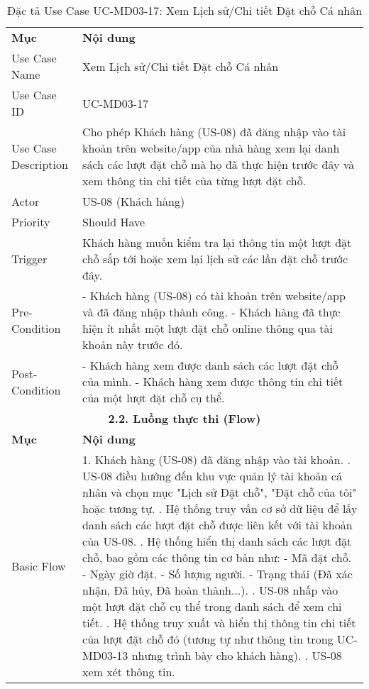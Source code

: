 \begin{longtable}{|m{4cm}|p{11cm}|}
\caption{Đặc tả Use Case UC-MD03-17: Xem Lịch sử/Chi tiết Đặt chỗ Cá nhân} \label{tab:uc_md03_17} \\
\hline

\endhead %
\hline
\endfoot %
\hline
\endlastfoot %
\multicolumn{2}{|c|}{\textbf{2.1. Tóm tắt (Summary)}} \\
\hline
\textbf{Mục} & \textbf{Nội dung} \\
\hline
Use Case Name & Xem Lịch sử/Chi tiết Đặt chỗ Cá nhân \\
\hline
Use Case ID & UC-MD03-17 \\
\hline
Use Case Description & Cho phép Khách hàng (US-08) đã đăng nhập vào tài khoản trên website/app của nhà hàng xem lại danh sách các lượt đặt chỗ mà họ đã thực hiện trước đây và xem thông tin chi tiết của từng lượt đặt chỗ. \\
\hline
Actor & US-08 (Khách hàng) \\
\hline
Priority & Should Have \\
\hline
Trigger & Khách hàng muốn kiểm tra lại thông tin một lượt đặt chỗ sắp tới hoặc xem lại lịch sử các lần đặt chỗ trước đây. \\
\hline
Pre-Condition & - Khách hàng (US-08) có tài khoản trên website/app và đã đăng nhập thành công. \newline - Khách hàng đã thực hiện ít nhất một lượt đặt chỗ online thông qua tài khoản này trước đó. \\
\hline
Post-Condition & - Khách hàng xem được danh sách các lượt đặt chỗ của mình. \newline - Khách hàng xem được thông tin chi tiết của một lượt đặt chỗ cụ thể. \\
\hline
\multicolumn{2}{|c|}{\textbf{2.2. Luồng thực thi (Flow)}} \\
\hline
\textbf{Mục} & \textbf{Nội dung} \\
\hline
Basic Flow & 1. Khách hàng (US-08) đã đăng nhập vào tài khoản. \newline 2. US-08 điều hướng đến khu vực quản lý tài khoản cá nhân và chọn mục "Lịch sử Đặt chỗ", "Đặt chỗ của tôi" hoặc tương tự. \newline 3. Hệ thống truy vấn cơ sở dữ liệu để lấy danh sách các lượt đặt chỗ được liên kết với tài khoản của US-08. \newline 4. Hệ thống hiển thị danh sách các lượt đặt chỗ, bao gồm các thông tin cơ bản như: \newline    - Mã đặt chỗ. \newline    - Ngày giờ đặt. \newline    - Số lượng người. \newline    - Trạng thái (Đã xác nhận, Đã hủy, Đã hoàn thành...). \newline 5. US-08 nhấp vào một lượt đặt chỗ cụ thể trong danh sách để xem chi tiết. \newline 6. Hệ thống truy xuất và hiển thị thông tin chi tiết của lượt đặt chỗ đó (tương tự như thông tin trong UC-MD03-13 nhưng trình bày cho khách hàng). \newline 7. US-08 xem xét thông tin. \\

\end{longtable}
